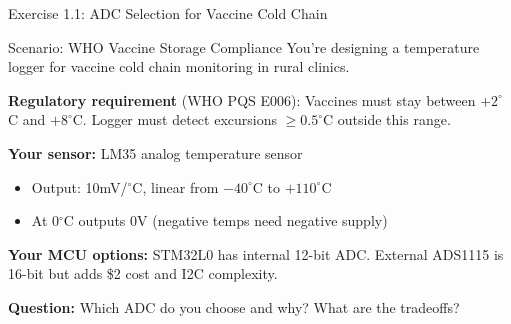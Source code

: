 \documentclass[aspectratio=169,11pt]{beamer}
\begin{document}
\begin{frame}{Exercise 1.1: ADC Selection for Vaccine Cold Chain}
    \begin{block}{Scenario: WHO Vaccine Storage Compliance}
        You're designing a temperature logger for vaccine cold chain monitoring in rural clinics.
        
        \vspace{0.2cm}
        \textbf{Regulatory requirement} (WHO PQS E006): Vaccines must stay between $+2^\circ$C and $+8^\circ$C. Logger must detect excursions $\geq 0.5^\circ$C outside this range.
        
        \vspace{0.2cm}
        \textbf{Your sensor:} LM35 analog temperature sensor
        \begin{itemize}
            \item Output: 10mV/$^\circ$C, linear from $-40^\circ$C to $+110^\circ$C
            \item At 0$^\circ$C outputs 0V (negative temps need negative supply)
        \end{itemize}
        
        \vspace{0.2cm}
        \textbf{Your MCU options:} STM32L0 has internal 12-bit ADC. External ADS1115 is 16-bit but adds \$2 cost and I2C complexity.
    \end{block}
    
    \vspace{0.2cm}
    \textbf{Question:} Which ADC do you choose and why? What are the tradeoffs?
\end{frame}
\end{document}
